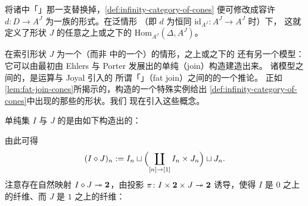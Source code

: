 将诸\trCospan{}中「\trDiagram{}」那一支替换掉，\cref{def:infinity-category-of-cones}%
便可修改成容许 $d\colon D\to A^{J}$ 为一族\trDiagram{}的形式。在泛情形
（即 $d$ 为恒同\trFunctor{} $\mathrm{id}_{A^{J}}\colon A^{J}\to A^{J}$ 时）下，%
这就定义了形状 $J$ 的任意\trDiagram{}之上或之下的\trInfinityCategoryOfCones{}%
$\mathrm{Hom}_{A^{J}}(\Delta,A^{J})$。

在索引形状 $J$ 为一个\trSimplicialSet（而非\trCartesianClosed{}\trInfinityCosmos{}%
中的一个\trInfinityCategory）的情形，\trDiagram{}之上或之下的%
\trInfinityCategoryOfCones{}还有另一个模型：它可以由最初由 Ehlers 与 Porter
\cite{bib40} 发展出的单纯\trJoin（join）构造建造出来。
诸模型之间的\trEquivalence{}，是\trJoin{}运算与 Joyal \cite[\S9]{bib63} 引入的
所谓「\trFatJoin」（fat join）之间的\trEquivalence{}的一个推论。
正如\cref{lem:fat-join-cones}所揭示的，\trFatJoin{}构造的一个特殊实例给出%
\cref{def:infinity-category-of-cones}中出现的那些\trCone{}的形状。我们
现在引入这些概念。

\begin{definition}[\trFatJoin]\label{def:fat-join}
单纯集 $I$ 与 $J$ 的\textbf{\trFatJoin}是由如下\trPushout{}构造出的\trSimplicialSet：
\begin{center}
\end{center}
由此可得
\begin{equation*}
(I\diamond J)_{n}:=I_{n}\sqcup\Bigl(\coprod_{[n]\to[1]}I_{n}\times J_{n}\Bigr)\sqcup J_{n}.
\end{equation*}
注意存在自然映射 $I\diamond J\twoheadrightarrow\mathbf{2}$，由投影
$\pi\colon I\times\mathbf{2}\times J\twoheadrightarrow\mathbf{2}$ 诱导，使得 $I$ 是
$0$ 之上的纤维、而 $J$ 是 $1$ 之上的纤维：
\begin{center}
\end{center}
\end{definition}

